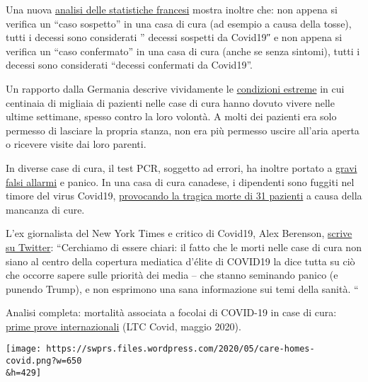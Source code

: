 Una nuova
\href{https://covidinfos.net/covid19/deces-dus-au-covid-19-le-nombre-officiel-de-morts-en-france-est-il-surestime/502/}{analisi
delle statistiche francesi} mostra inoltre che: non appena si verifica
un ``caso sospetto'' in una casa di cura (ad esempio a causa della
tosse), tutti i decessi sono considerati '' decessi sospetti da Covid19″
e non appena si verifica un ``caso confermato'' in una casa di cura
(anche se senza sintomi), tutti i decessi sono considerati ``decessi
confermati da Covid19''.

Un rapporto dalla Germania descrive vividamente le
\href{https://www.rnd.de/gesundheit/corona-ist-mir-egal-warum-helga-witt-kronshage-86-lieber-sterben-will-als-eingesperrt-zu-sein-3MEBDIOBEFA6BDULC4N5WGZJG4.html}{condizioni
estreme} in cui centinaia di migliaia di pazienti nelle case di cura
hanno dovuto vivere nelle ultime settimane, spesso contro la loro
volontà. A molti dei pazienti era solo permesso di lasciare la propria
stanza, non era più permesso uscire all'aria aperta o ricevere visite
dai loro parenti.

In diverse case di cura, il test PCR, soggetto ad errori, ha inoltre
portato a
\href{https://www.wjhl.com/local-coronavirus-coverage/agape-nursing-home-says-residents-who-tested-positive-for-covid-19-were-false-positives/}{gravi
falsi allarmi} e panico. In una casa di cura canadese, i dipendenti sono
fuggiti nel timore del virus Covid19,
\href{https://www.nytimes.com/2020/04/16/world/canada/montreal-nursing-homes-coronavirus.html}{provocando
la tragica morte di 31 pazienti} a causa della mancanza di cure.

L'ex giornalista del New York Times e critico di Covid19, Alex Berenson,
\href{https://twitter.com/AlexBerenson/status/1257496834043531267}{scrive
su Twitter}: ``Cerchiamo di essere chiari: il fatto che le morti nelle
case di cura non siano al centro della copertura mediatica d'élite di
COVID19 la dice tutta su ciò che occorre sapere sulle priorità dei media
-- che stanno seminando panico (e punendo Trump), e non esprimono una
sana informazione sui temi della sanità. ``

Analisi completa: mortalità associata a focolai di COVID-19 in case di
cura:
\href{https://ltccovid.org/2020/04/12/mortality-associated-with-covid-19-outbreaks-in-care-homes-early-international-evidence/}{prime
prove internazionali} (LTC Covid, maggio 2020).

\texttt{[image: https://swprs.files.wordpress.com/2020/05/care-homes-covid.png?w=650\\\&h=429]}

